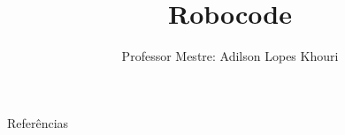\documentclass[compress, hyperref={pdfpagelayout=SinglePage}]{beamer}
\title[Aula Teste]{Robocode}
\author{Professor Mestre: Adilson Lopes Khouri}
\begin{document}
	\begin{frame}
		\titlepage
	\end{frame}
	
	
	
	
	
		

	

	

	\begin{frame}{}
		\begin{block}{Referências}
			\tiny
			\nocite{*}
			
	    		
		\end{block}
	\end{frame}
\end{document}
